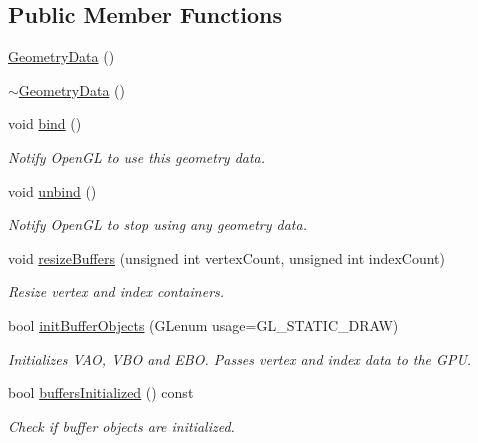\subsection*{Public Member Functions}
\begin{DoxyCompactItemize}
\item 
\mbox{\hyperlink{classec_1_1_geometry_data_a21db28a4c6d964c8bc59cc698170e77c}{Geometry\+Data}} ()
\item 
\mbox{\hyperlink{classec_1_1_geometry_data_ab0684d232286015d10fb40ab49836c84}{$\sim$\+Geometry\+Data}} ()
\item 
void \mbox{\hyperlink{classec_1_1_geometry_data_acb50971e6fbd928172731a3427d22691}{bind}} ()
\begin{DoxyCompactList}\small\item\em Notify Open\+GL to use this geometry data. \end{DoxyCompactList}\item 
void \mbox{\hyperlink{classec_1_1_geometry_data_abb54af4b2922eb16973b450d6cf0beae}{unbind}} ()
\begin{DoxyCompactList}\small\item\em Notify Open\+GL to stop using any geometry data. \end{DoxyCompactList}\item 
void \mbox{\hyperlink{classec_1_1_geometry_data_a85ce34e18732d88632310d751a6c2cee}{resize\+Buffers}} (unsigned int vertex\+Count, unsigned int index\+Count)
\begin{DoxyCompactList}\small\item\em Resize vertex and index containers. \end{DoxyCompactList}\item 
bool \mbox{\hyperlink{classec_1_1_geometry_data_ade0586602da2a8917fe55b592ff44a57}{init\+Buffer\+Objects}} (G\+Lenum usage=G\+L\+\_\+\+S\+T\+A\+T\+I\+C\+\_\+\+D\+R\+AW)
\begin{DoxyCompactList}\small\item\em Initializes V\+AO, V\+BO and E\+BO. Passes vertex and index data to the G\+PU. \end{DoxyCompactList}\item 
bool \mbox{\hyperlink{classec_1_1_geometry_data_a23c0090061b5b21b74f070916915ca69}{buffers\+Initialized}} () const
\begin{DoxyCompactList}\small\item\em Check if buffer objects are initialized. \end{DoxyCompactList}\item 

\end{DoxyCompactItemize}
